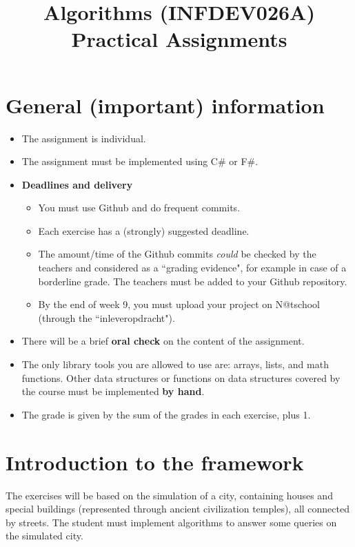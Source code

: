 \documentclass[10pt,a4paper]{article}
\title{Algorithms (INFDEV026A) \\ Practical Assignments}
\author { }
\date { }
\begin{document}
\maketitle

\vspace{-50pt}
\section*{General (important) information}
\begin{itemize}[noitemsep]
\item The assignment is individual.
\item The assignment must be implemented using C\# or F\#.
\item \textbf{Deadlines and delivery}
\begin{itemize}
\item You must use Github and do frequent commits.
\item Each exercise has a (strongly) suggested deadline.
\item The amount/time of the Github commits \textit{could} be checked by the teachers and considered as a ``grading evidence", for example in case of a borderline grade. The teachers must be added to your Github repository. 
\item By the end of week 9, you must upload your project on N@tschool (through the ``inleveropdracht").
\end{itemize}
\item There will be a brief \textbf{oral check} on the content of the assignment.
\item The only library tools you are allowed to use are: arrays, lists, and math functions. Other data structures or functions on data structures covered by the course must be implemented \textbf{by hand}.
\item The grade is given by the sum of the grades in each exercise, plus 1.
\end{itemize}

\section*{Introduction to the framework}
The exercises will be based on the simulation of a city, containing houses and special buildings (represented through ancient civilization temples), all connected by streets. The student must implement algorithms to answer some queries on the simulated city.
\end{document}
